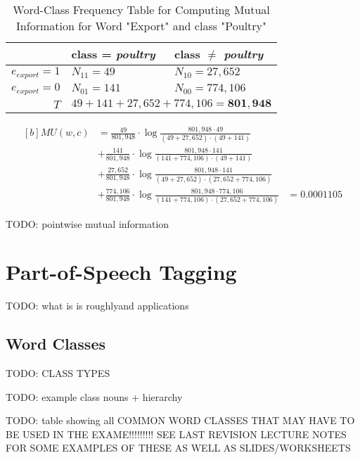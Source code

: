 \documentclass{article}
\begin{document}
\begin{table}[H]
	\centering
	\begin{tabular}{|r|l|l|}
		\hline
		& class = \textit{poultry} & class $\neq$ \textit{poultry} \\
		\hline
		$e_{export} = 1$ & $N_{11} = 49$ & $N_{10} = 27,652$ \\
		$e_{export} = 0$ & $N_{01} = 141$ & $N_{00} = 774,106$ \\
		\hline
		$T$ & \multicolumn{2}{l|}{$49 + 141 + 27,652 + 774,106 = \mathbf{801,948}$}  \\
		\hline
	\end{tabular}
	\caption{Word-Class Frequency Table for Computing Mutual Information for Word "Export" and class "Poultry"}
	\label{tab:example-mu-freq-table}
\end{table}

\begin{equation}
\begin{aligned}[b]
	MU(w, c) &= \frac{49}{801,948} \cdot \log \frac{801,948 \cdot 49 }{(49 + 27,652) \cdot (49 + 141)} \\
	&+ \frac{141}{801,948} \cdot \log \frac{801,948 \cdot 141 }{(141 + 774,106) \cdot (49 + 141)} \\
	&+ \frac{27,652}{801,948} \cdot \log \frac{801,948 \cdot 141 }{(49 + 27,652) \cdot (27,652 + 774,106)} \\
	&+ \frac{774,106}{801,948} \cdot \log \frac{801,948 \cdot 774,106 }{(141 + 774,106) \cdot (27,652 + 774,106)}
	&= 0.0001105
	\label{eq:text-classification-mu-info-example}
\end{aligned}
\end{equation}

TODO: pointwise mutual information

\section{Part-of-Speech Tagging}

TODO: what is is roughlyand applications

\subsection{Word Classes}

TODO: CLASS TYPES

TODO: example class nouns + hierarchy

TODO: table showing all COMMON WORD CLASSES THAT MAY HAVE TO BE USED IN THE EXAME!!!!!!!!! SEE LAST REVISION LECTURE NOTES FOR SOME EXAMPLES OF THESE AS WELL AS SLIDES/WORKSHEETS
\end{document}
